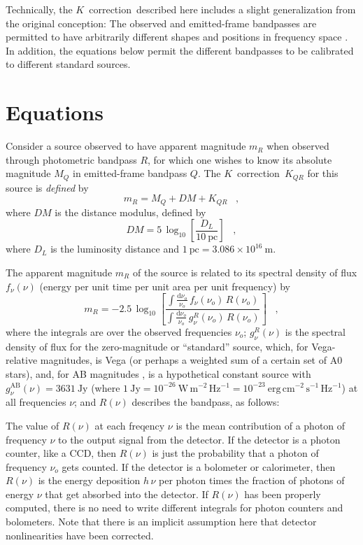 \documentclass[preprint]{aastex}
\newcommand{\kcorrection}{$K$~correction}
\newcommand{\nuobs}{\nu_o}
\begin{document}
Technically, the \kcorrection\ described here includes a slight
generalization from the original conception: The observed and
emitted-frame bandpasses are permitted to have arbitrarily different
shapes and positions in frequency space \citep[as they are in,
eg,][]{kim96a}.  In addition, the equations below permit the different
bandpasses to be calibrated to different standard sources.

\section{Equations}

Consider a source observed to have apparent magnitude $m_R$ when
observed through photometric bandpass $R$, for which one wishes to
know its absolute magnitude $M_Q$ in emitted-frame bandpass $Q$.  The
\kcorrection\ $K_{QR}$ for this source is \emph{defined} by
\begin{equation}
\label{eq:definition}
m_R = M_Q + DM + K_{QR} \;\;\;,
\end{equation}
where $DM$ is the distance modulus, defined by
\begin{equation}
DM = 5\,\log_{10}\left[\frac{D_L}{10~\mathrm{pc}}\right] \;\;\;,
\end{equation}
where $D_L$ is the luminosity distance \citep[eg,][]{hogg99cosm} and
$1~\mathrm{pc}= 3.086\times 10^{16}~\mathrm{m}$.

The apparent magnitude $m_R$ of the source is related to its spectral
density of flux $f_{\nu}(\nu)$ (energy per unit time per unit area per
unit frequency) by
\begin{equation}
m_R = -2.5\,\log_{10}\left[
  \frac{\displaystyle
          \int\frac{\mathrm{d}\nuobs}{\nuobs}\,f_{\nu}(\nuobs)\,R(\nuobs)}
       {\displaystyle
          \int\frac{\mathrm{d}\nuobs}{\nuobs}\,g^R_{\nu}(\nuobs)\,R(\nuobs)}
\right] \;\;\;,
\end{equation}
where the integrals are over the observed frequencies $\nuobs$;
$g^{R}_{\nu}(\nu)$ is the spectral density of flux for the
zero-magnitude or ``standard'' source, which, for Vega-relative
magnitudes, is Vega (or perhaps a weighted sum of a certain set of A0
stars), and, for AB magnitudes \citep{oke83a}, is a hypothetical
constant source with $g^\mathrm{AB}_{\nu}(\nu)=3631~\mathrm{Jy}$
(where $1~\mathrm{Jy}= 10^{-26}~\mathrm{W\,m^{-2}\,Hz^{-1}}=
10^{-23}~\mathrm{erg\,cm^{-2}\,s^{-1}\,Hz^{-1}}$) at all frequencies
$\nu$; and $R(\nu)$ describes the bandpass, as follows:

The value of $R(\nu)$ at each freqency $\nu$ is the mean contribution
of a photon of frequency $\nu$ to the output signal from the detector.
If the detector is a photon counter, like a CCD, then $R(\nu)$ is just
the probability that a photon of frequency $\nuobs$ gets counted.  If
the detector is a bolometer or calorimeter, then $R(\nu)$ is the
energy deposition $h\,\nu$ per photon times the fraction of photons of
energy $\nu$ that get absorbed into the detector.  If $R(\nu)$ has
been properly computed, there is no need to write different integrals
for photon counters and bolometers.  Note that there is an implicit
assumption here that detector nonlinearities have been corrected.
\end{document}
